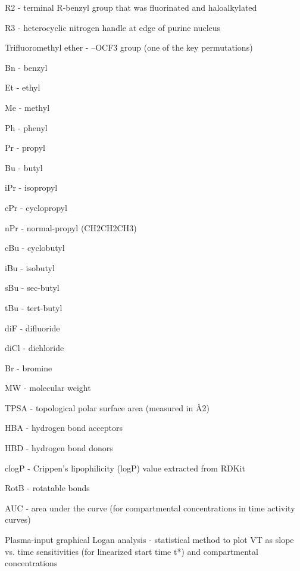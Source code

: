 \documentclass[times, twoside]{zHenriquesLab-StyleBioRxiv}
\begin{document}
		R2 - terminal R-benzyl group that was fluorinated and haloalkylated
		
		R3 - heterocyclic nitrogen handle at edge of purine nucleus
		
		Trifluoromethyl ether - –OCF3 group (one of the key permutations)
		
		Bn - benzyl
		
		Et - ethyl
		
		Me - methyl
		
		Ph - phenyl
		
		Pr - propyl
		
		Bu - butyl
		
		iPr - isopropyl
		
		cPr - cyclopropyl
		
		nPr - normal-propyl (CH2CH2CH3)
		
		cBu - cyclobutyl
		
		iBu - isobutyl
		
		sBu - sec-butyl
		
		tBu - tert-butyl
		
		diF - difluoride
		
		diCl - dichloride
		
		Br - bromine
		
		MW - molecular weight
		
		TPSA - topological polar surface area (measured in Å2)
		
		HBA - hydrogen bond acceptors
		
		HBD - hydrogen bond donors
		
		clogP - Crippen’s lipophilicity (logP) value extracted from RDKit
		
		RotB - rotatable bonds
		
		AUC - area under the curve (for compartmental concentrations in time activity curves)
		
		Plasma-input graphical Logan analysis - statistical method to plot VT as slope vs. time sensitivities (for linearized start time t*) and compartmental concentrations
		
\end{document}
